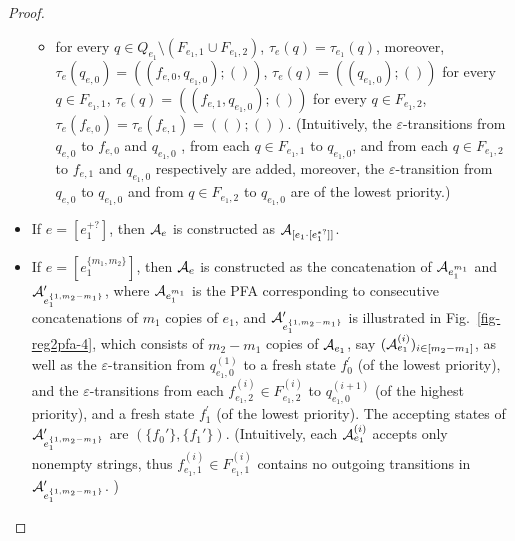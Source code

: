 \begin{proof}
\begin{itemize}
\begin{itemize}
                \item for every $q \in Q_{e_1} \setminus (F_{e_1,1} \cup F_{e_1,2})$,  $\tau_e(q) = \tau_{e_1}(q)$, moreover, $\tau_e(q_{e,0}) = ((f_{e,0}, q_{e_1,0}); ())$,  $\tau_e(q) = ((q_{e_1,0});())$ for every $q \in F_{e_1,1}$, $\tau_e(q) = ((f_{e,1}, q_{e_1,0});())$ for every $q \in F_{e_1,2}$, $\tau_e(f_{e,0}) =\tau_e(f_{e,1}) = (();())$. (Intuitively, the $\varepsilon$-transitions from $q_{e,0}$ to $f_{e,0}$ and $q_{e_1,0}$ , from each $q \in F_{e_1,1}$ to  $q_{e_1,0}$, and from each $q \in F_{e_1,2}$ to $f_{e,1}$ and $q_{e_1,0}$ respectively are added, moreover, the $\varepsilon$-transition from $q_{e,0}$ to $q_{e_1,0}$ and from $q \in F_{e_1,2}$ to $q_{e_1,0}$ are of the lowest priority.)
            \end{itemize}
        \item If $e = [e_1^{+?}]$, then $\mathcal{A}_e$ is constructed as $\mathcal{A}_{[e_1 \cdot [e_1^{*?}]]}$.
        \item If $e = [e_1^{\{m_1,m_2\}}]$, then $\mathcal{A}_e$ is constructed as the concatenation of $\mathcal{A}_{e_1^{m_1}}$ and $\mathcal{A}^\prime_{e_1^{\{1,m_2-m_1\}}}$, where $\mathcal{A}_{e_1^{m_1}}$ is the PFA corresponding to consecutive concatenations of $m_1$ copies of $e_1$, and $\mathcal{A}^\prime_{e_1^{\{1,m_2-m_1\}}}$ is illustrated in Fig.~\ref{fig-reg2pfa-4}, which consists of $m_2-m_1$ copies of $\mathcal{A}_{e_1}$, say $(\mathcal{A}^{(i)}_{e_1})_{i \in [m_2-m_1]}$, as well as the $\varepsilon$-transition from $q^{(1)}_{e_1,0}$ to a fresh state $f^\prime_0$ (of the lowest priority), and the $\varepsilon$-transitions from each $f^{(i)}_{e_1,2} \in F^{(i)}_{e_1,2}$ to $q^{(i+1)}_{e_1,0}$ (of the highest priority), and a fresh state $f^\prime_1$ (of the lowest priority). The accepting states of $\mathcal{A}^\prime_{e_1^{\{1,m_2-m_1\}}}$ are $(\{f_0'\},\{f_1'\})$. (Intuitively, each $\mathcal{A}^{(i)}_{e_1}$ accepts only nonempty strings, thus $f^{(i)}_{e_1,1} \in F^{(i)}_{e_1,1}$ contains no outgoing transitions in $\mathcal{A}^\prime_{e_1^{\{1,m_2-m_1\}}}$. )
            \begin{figure}[ht]
                \centering

\end{figure}
\end{itemize}
\end{proof}
